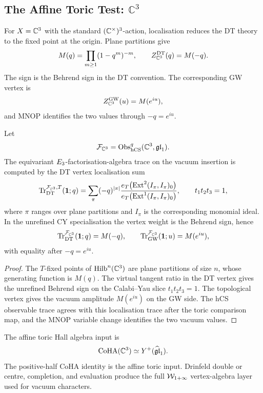 \subsection*{The Affine Toric Test: \texorpdfstring{$\mathbb C^3$}{C3}}
\label{subsec:c3-toric-test}

For \(X=\mathbb{C}^3\) with the standard
\((\mathbb{C}^\times)^3\)-action, localisation reduces the DT theory to the
fixed point at the origin.  Plane partitions give
\[
  M(q)=\prod_{m\geq1}(1-q^m)^{-m},
  \qquad
  Z^{\mathrm{DT}}_{\mathbb{C}^3}(q)=M(-q).
\]
The sign is the Behrend sign in the DT convention.  The corresponding
GW vertex is
\[
  Z^{\mathrm{GW}}_{\mathbb{C}^3}(u)=M(e^{iu}),
\]
and MNOP identifies the two values through \(-q=e^{iu}\).

\begin{proposition}
\label{wn:prop:c3-toric-trace}
Let
\[
  \mathcal{F}_{\mathbb{C}^3}=\mathrm{Obs}^q_{\mathrm{hCS}}(\mathbb{C}^3,\mathfrak{gl}_1).
\]
The equivariant \(E_3\)-factorisation-algebra trace on the
vacuum insertion is computed by the DT vertex localisation sum
\[
  \mathrm{Tr}^{\mathcal{F}_{\mathbb{C}^3},T}_{\mathrm{DT}}(\mathbf 1;q)
  =
  \sum_{\pi}
  (-q)^{|\pi|}
  \frac{
    e_T\!\left(\operatorname{Ext}^2(I_\pi,I_\pi)_0\right)}
   {e_T\!\left(\operatorname{Ext}^1(I_\pi,I_\pi)_0\right)},
  \qquad t_1t_2t_3=1,
\]
where \(\pi\) ranges over plane partitions and \(I_\pi\) is the
corresponding monomial ideal.  In the unrefined CY specialisation the
vertex weight is the Behrend sign, hence
\[
  \mathrm{Tr}^{\mathcal{F}_{\mathbb{C}^3}}_{\mathrm{DT}}(\mathbf 1;q)=M(-q),
  \qquad
  \mathrm{Tr}^{\mathcal{F}_{\mathbb{C}^3}}_{\mathrm{GW}}(\mathbf 1;u)=M(e^{iu}),
\]
with equality after \(-q=e^{iu}\).
\end{proposition}

\begin{proof}
The \(T\)-fixed points of \(\mathrm{Hilb}^n(\mathbb{C}^3)\) are plane partitions of
size \(n\), whose generating function is \(M(q)\).  The virtual tangent
ratio in the DT vertex gives the unrefined Behrend sign on the
Calabi--Yau slice \(t_1t_2t_3=1\).  The topological vertex gives the
vacuum amplitude \(M(e^{iu})\) on the GW side.  The hCS observable
trace agrees with this localisation trace after the toric comparison
map, and the MNOP variable change identifies the two vacuum values.
\end{proof}

The affine toric Hall algebra input is
\[
  \mathrm{CoHA}(\mathbb{C}^3)\simeq Y^+(\widehat{\mathfrak{gl}}_1).
\]
The positive-half CoHA identity is the affine toric input.  Drinfeld
double or centre, completion, and evaluation produce the full
\(\mathcal{W}_{1+\infty}\) vertex-algebra layer used for vacuum characters.

